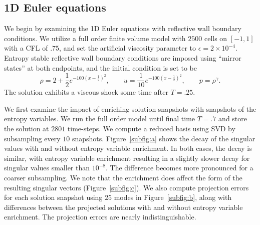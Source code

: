 \documentclass[preprint,10pt]{elsarticle}
\theoremstyle{definition}
\theoremstyle{lemma}
\theoremstyle{theorem}
\theoremstyle{assumption}
\newcommand{\LRp}[1]{\left( #1 \right)}
\begin{document}
\subsection{1D Euler equations}

We begin by examining the 1D Euler equations with reflective wall boundary conditions.  We utilize a full order finite volume model with $2500$ cells on $[-1,1]$ with a CFL of $.75$, and set the artificial viscosity parameter to $\epsilon = 2\times 10^{-4}$.  Entropy stable reflective wall boundary conditions are imposed using ``mirror states'' at both endpoints, and the initial condition is set to be 
\[
\rho = 2 + \frac{1}{2}e^{-100\LRp{x-\frac{1}{2}}^2}, \qquad 
    u = \frac{1}{10}e^{-100\LRp{x-\frac{1}{2}}^2}, \qquad p = \rho^{\gamma}.
\]
The solution exhibits a viscous shock some time after $T=.25$.  

We first examine the impact of enriching solution snapshots with snapshots of the entropy variables.  We run the full order model until final time $T=.7$ and store the solution at $2801$ time-steps.  We compute a reduced basis using SVD by subsampling every $10$ snapshots.  Figure~\ref{subfig:a} shows the decay of the singular values with and without entropy variable enrichment.  In both cases, the decay is similar, with entropy variable enrichment resulting in a slightly slower decay for singular values smaller than $10^{-8}$.  The difference becomes more pronounced for a coarser subsampling.  We note that the enrichment does affect the form of the resulting singular vectors (Figure~\ref{subfig:c}).  We also compute projection errors for each solution snapshot using $25$ modes in Figure~\ref{subfig:b}, along with differences between the projected solutions with and without entropy variable enrichment.  The projection errors are nearly indistinguishable.  %
\end{document}
